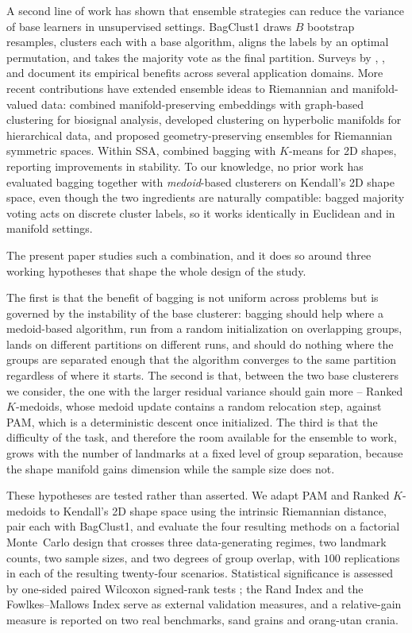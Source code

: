 \documentclass[review,11pt,3p,authoryear]{elsarticle}
\begin{document}
A second line of work has shown that ensemble strategies can reduce the
variance of base learners in unsupervised settings. BagClust1
\citep{dudoit2003bagging} draws $B$ bootstrap resamples, clusters each
with a base algorithm, aligns the labels by an optimal permutation, and
takes the majority vote as the final partition. Surveys by
\citet{ghaemi2009survey}, \citet{vega2011survey}, and
\citet{golalipour2021clustering} document its empirical benefits across
several application domains. More recent contributions have extended
ensemble ideas to Riemannian and manifold-valued data: \citet{soguero2023clustering}
combined manifold-preserving embeddings with graph-based clustering for
biosignal analysis, \citet{tabaghi2024hyperbolic} developed clustering
on hyperbolic manifolds for hierarchical data, and \citet{luo2024geometric}
proposed geometry-preserving ensembles for Riemannian symmetric spaces.
Within SSA, \citet{assis2021using} combined bagging with $K$-means for
2D shapes, reporting improvements in stability. To our knowledge, no
prior work has evaluated bagging together with \emph{medoid}-based
clusterers on Kendall's 2D shape space, even though the two ingredients
are naturally compatible: bagged majority voting acts on discrete cluster
labels, so it works identically in Euclidean and in manifold settings.

The present paper studies such a combination, and it does so around three
working hypotheses that shape the whole design of the study.

The first is that the benefit of bagging is not uniform across problems but is
governed by the instability of the base clusterer: bagging should help where a
medoid-based algorithm, run from a random initialization on overlapping groups,
lands on different partitions on different runs, and should do nothing where
the groups are separated enough that the algorithm converges to the same
partition regardless of where it starts. The second is that, between the two
base clusterers we consider, the one with the larger residual variance should
gain more -- Ranked $K$-medoids, whose medoid update contains a random
relocation step, against PAM, which is a deterministic descent once
initialized. The third is that the difficulty of the task, and therefore the
room available for the ensemble to work, grows with the number of landmarks at
a fixed level of group separation, because the shape manifold gains dimension
while the sample size does not.

These hypotheses are tested rather than asserted. We adapt PAM and Ranked
$K$-medoids to Kendall's 2D shape space using the intrinsic Riemannian
distance, pair each with BagClust1, and evaluate the four resulting methods on
a factorial Monte~Carlo design that crosses three data-generating regimes, two
landmark counts, two sample sizes, and two degrees of group overlap, with $100$
replications in each of the resulting twenty-four scenarios. Statistical
significance is assessed by one-sided paired Wilcoxon signed-rank tests
\citep{wilcoxon1992individual}; the Rand Index \citep{rand1971objective} and
the Fowlkes--Mallows Index \citep{fowlkes1983method,hubert1985comparing} serve
as external validation measures, and a relative-gain measure is reported on
two real benchmarks, sand grains and orang-utan crania.
\end{document}
